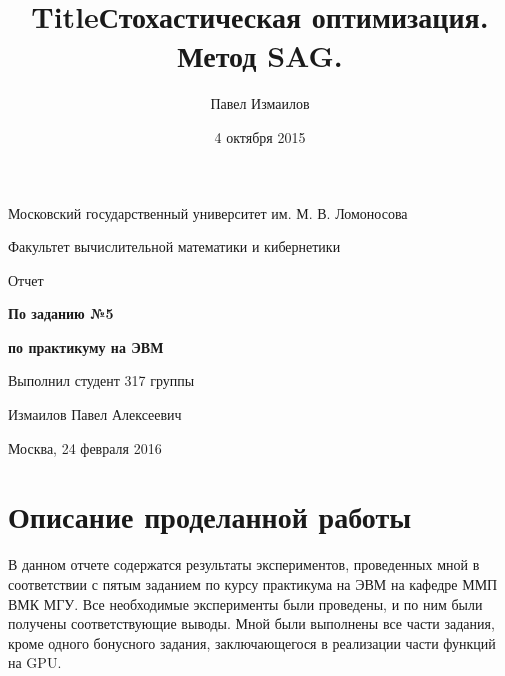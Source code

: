 \documentclass[12pt]{article}
\title{Title}
\title{Стохастическая оптимизация. Метод SAG.}
\date{4 октября 2015}
\author{Павел Измаилов}
\begin{document}

\renewcommand{\refname}{\centerline{\bf Список литературы}}

\newlength{\arrayrulewidthOriginal}
\newcommand{\net}{\mbox{net}}
\newcommand{\R}{\mathbb{R}}
\newcommand{\derivative}[2]{\frac{\partial #1}{\partial #2}}
\newcommand{\Cline}[2]{%
  \noalign{\global\setlength{\arrayrulewidthOriginal}{\arrayrulewidth}}%
  \noalign{\global\setlength{\arrayrulewidth}{#1}}\cline{#2}%
  \noalign{\global\setlength{\arrayrulewidth}{\arrayrulewidthOriginal}}}

\centerline{Московский государственный университет им. М. В. Ломоносова}

\centerline{Факультет вычислительной математики и кибернетики}

\vspace{5 cm}

\centerline{\Large Отчет}

\vspace{1 cm}

\centerline{\Large \bf По заданию №5}
\centerline{\Large \bf по практикуму на ЭВМ}

\vspace{6 cm}

\begin{flushright} 
Выполнил студент 317 группы

Измаилов Павел Алексеевич
\end{flushright}

\vfill 

\centerline{Москва,  24 февраля 2016}
\thispagestyle{empty} 
\pagebreak
\tableofcontents
\pagebreak
\section{Описание проделанной работы}
	\hspace{0.6cm}В данном отчете содержатся результаты экспериментов, проведенных мной в соответствии с пятым заданием по курсу практикума на ЭВМ на кафедре ММП ВМК МГУ. Все необходимые эксперименты были проведены, и по ним были получены соответствующие выводы. Мной были выполнены все части задания, кроме одного бонусного задания, заключающегося в реализации части функций на GPU.
\end{document}
